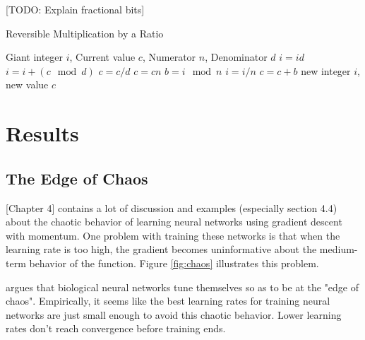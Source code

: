 \documentclass{article}
\begin{document}
[TODO: Explain fractional bits]

\begin{algorithm}
   \caption{Reversible Multiplication by a Ratio}
   \label{alg:reversible-mult}
\begin{algorithmic}
    Giant integer $i$, Current value $c$, Numerator $n$, Denominator $d$
   \STATE $i = id$ 
   \STATE $i = i + (c \mod d)$ 
   \STATE $c = c / d$ 
   \STATE $c = cn$ 
   \STATE $b = i \mod n$ 
   \STATE $i = i / n$ 
   \STATE $c = c + b$ 
   \RETURN new integer $i$, new value $c$
\end{algorithmic}
\end{algorithm}
%


\section{Results}

\subsection{The Edge of Chaos}

\cite{pearlmutter1996investigation}[Chapter 4] contains a lot of discussion and examples (especially section 4.4) about the chaotic behavior of learning neural networks using gradient descent with momentum.
One problem with training these networks is that when the learning rate is too high, the gradient becomes uninformative about the medium-term behavior of the function.
Figure \ref{fig:chaos} illustrates this problem.

\cite{pearlmutter2009sleep} argues that biological neural networks tune themselves so as to be at the "edge of chaos".
Empirically, it seems like the best learning rates for training neural networks are just small enough to avoid this chaotic behavior.
Lower learning rates don't reach convergence before training ends.
\end{document}
